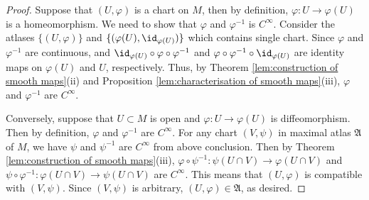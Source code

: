\begin{proof}
    Suppose that $(U, \varphi)$ is a chart on $M$, then by definition, $\varphi : U \to \varphi(U)$ is a homeomorphism. We need to show that $\varphi$ and $\varphi^{-1}$ is $C^\infty$. Consider the atlases $\{(U, \varphi)\}$ and $\{(\varphi(U), \id_{\varphi(U)})\}$ which contains single chart. Since $\varphi$ and $\varphi^{-1}$ are continuous, and $\id_{\varphi(U)} \circ \varphi \circ \varphi^{-1}$ and $\varphi \circ \varphi^{-1} \circ \id_{\varphi(U)}$ are identity maps on $\varphi(U)$ and $U$, respectively. Thus, by Theorem \ref{lem:construction of smooth maps}(ii) and Proposition \ref{lem:characterisation of smooth maps}(iii), $\varphi$ and $\varphi^{-1}$ are $C^\infty$.

    Conversely, suppose that $U \subset M$ is open and $\varphi : U \to \varphi(U)$ is diffeomorphism. Then by definition, $\varphi$ and $\varphi^{-1}$ are $C^\infty$. For any chart $(V, \psi)$ in maximal atlas $\mathfrak{A}$ of $M$, we have $\psi$ and $\psi^{-1}$ are $C^\infty$ from above conclusion. Then by Theorem \ref{lem:construction of smooth maps}(iii), $\varphi \circ \psi^{-1} : \psi(U \cap V) \to \varphi(U \cap V)$ and $\psi \circ \varphi^{-1} : \varphi(U \cap V) \to \psi(U \cap V)$ are $C^\infty$. This means that $(U, \varphi)$ is compatible with $(V, \psi)$. Since $(V, \psi)$ is arbitrary, $(U, \varphi) \in \mathfrak{A}$, as desired.
\end{proof}
